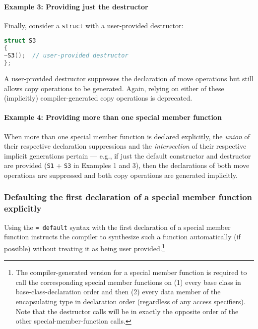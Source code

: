 \paragraph[Example 3: Providing just the destructor]{Example 3: Providing just the destructor}\label{example-3:-providing-just-the-destructor}

Finally, consider a \texttt{struct} with a user-provided destructor:


\begin{lstlisting}[language=C++]
struct S3
{
~S3();  // user-provided destructor
};
\end{lstlisting}

\noindent A user-provided destructor suppresses the declaration of move
operations but still allows copy operations to be generated. Again,
relying on either of these (implicitly) compiler-generated copy
operations is deprecated.

\paragraph[Example 4: Providing more than one special member function]{Example 4: Providing more than one special member function}\label{example-4:-providing-more-than-one-special-member}

When more than one special member function is declared explicitly, the
\emph{union} of their respective declaration suppressions and the
\emph{intersection} of their respective implicit generations pertain ---
e.g., if just the default constructor and destructor are provided
(\texttt{S1} + \texttt{S3} in Examples 1 and 3), then the declarations of both move
operations are suppressed and both copy operations are generated
implicitly.

\subsubsection[Defaulting the first declaration of a special member function explicitly]{Defaulting the first declaration of a special member function explicitly}\label{defaulting-the-first-declaration-of-a-special-member-function-explicitly}

Using the \texttt{=}~\texttt{default} syntax with the first declaration
of a special member function instructs the compiler to synthesize such a
function automatically (if possible) without treating it as being
user provided.{\cprotect\footnote{The compiler-generated version for a
special member function is required to call the corresponding special
member functions on (1) every base class in base-class-declaration
order and then (2) every data member of the encapsulating type in
declaration order (regardless of any access specifiers). Note that the
destructor calls will be in exactly the opposite order of the
other special-member-function calls.}}

